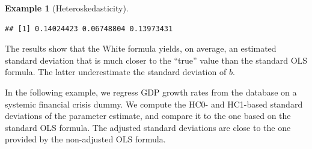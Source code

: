 \documentclass[
  12pt,
]{book}
\theoremstyle{definition}
\theoremstyle{definition}
\newtheorem{example}{Example}[chapter]
\theoremstyle{definition}
\theoremstyle{definition}
\theoremstyle{remark}
\begin{document}
\begin{example}[Heteroskedasticity]
\begin{verbatim}
## [1] 0.14024423 0.06748804 0.13973431
\end{verbatim}

The results show that the White formula yields, on average, an estimated standard deviation that is much closer to the ``true'' value than the standard OLS formula. The latter underestimate the standard deviation of \(b\).
\end{example}

In the following example, we regress GDP growth rates from the \citet{JST_2017} database on a systemic financial crisis dummy. We compute the HC0- and HC1-based standard deviations of the parameter estimate, and compare it to the one based on the standard OLS formula. The adjusted standard deviations are close to the one provided by the non-adjusted OLS formula.
\end{document}
